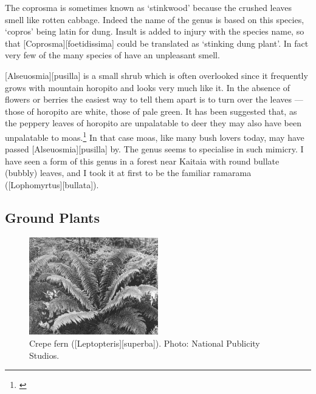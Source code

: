 The coprosma is sometimes known as `stinkwood' because the crushed leaves smell like rotten cabbage.
Indeed the name of the genus is based on this species, `copros' being latin for dung.
Insult is added to injury with the species name, so that [Coprosma][foetidissima] could be translated as `stinking dung plant'.
In fact very few of the many species of  have an unpleasant smell.

[Alseuosmia][pusilla] is a small shrub which is often overlooked since it frequently grows with mountain horopito and looks very much like it.
In the absence of flowers or berries the easiest way to tell them apart is to turn over the leaves --- those of horopito are white, those of  pale green.
It has been suggested that, as the peppery leaves of horopito are unpalatable to deer they may also have been unpalatable to moas.\footnote{\cite{greenwood1977evolution}}
In that case moas, like many bush lovers today, may have passed [Alseuosmia][pusilla] by.
The genus  seems to specialise in such mimicry.
I have seen a form of this genus in a forest near Kaitaia with round bullate (bubbly) leaves, and I took it at first to be the familiar ramarama ([Lophomyrtus][bullata]).

\subsection{Ground Plants}

\begin{figure}
	\includegraphics[width=0.5\textwidth]{graphics/figure62crepefern.jpg}
	\centering
	\caption[Crepe fern (\emph{Leptopteris superba})]{Crepe fern ([Leptopteris][superba]).
	Photo: National Publicity Studios.}%
	\label{fig:62crepefern}
\end{figure}

